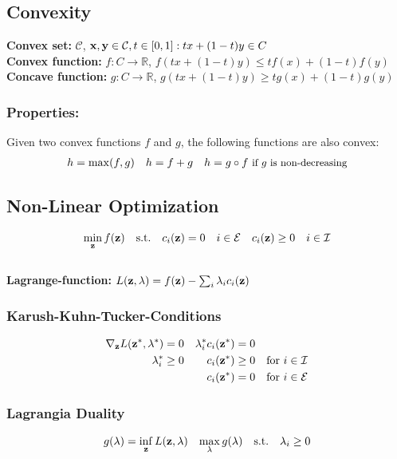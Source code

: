 \begin{mdframed}[style=eqbox]
\subsection{Convexity}
\textbf{Convex set:} $\mathcal C$, $\mathbf{x}, \mathbf{y} \in \mathcal C, t \in [0,1]: t x + (1-t)y \in C$\\
\textbf{Convex function:} $f: C \to \mathbb R$, $f(t x + (1-t)y) \leq tf(x) + (1-t)f(y)$\\
\textbf{Concave function:} $g: C \to \mathbb R$, $g(t x + (1-t)y) \geq tg(x) + (1-t)g(y)$
\subsubsection{Properties:}
Given two convex functions $f$ and $g$, the following functions are also convex:
\vspace*{-8pt}\begin{align*}
  h = \max (f, g) && h = f + g && h = g \circ f \text{ \small{if $g$ is non-decreasing}}
\end{align*}
\end{mdframed}
%
\begin{mdframed}[style=eqbox]
\subsection{Non-Linear Optimization}
\vspace*{-6pt}\begin{align*}
  \min_{\mathbf{z}} f(\mathbf{z}) &&\text{s.t.} \quad c_i(\mathbf{z}) = 0 \quad i \in \mathcal E && c_i(\mathbf{z}) \geq 0 \quad i \in \mathcal I
\end{align*}\vspace*{-14pt}\\
\textbf{Lagrange-function:} $L(\mathbf{z}, \mathbf{\lambda}) = f(\mathbf{z}) - \sum_i \lambda_i c_i(\mathbf{z})$
\subsubsection{Karush-Kuhn-Tucker-Conditions}
\vspace*{-8pt}\begin{align*}
  \nabla_{\mathbf{z}} L(\mathbf{z}^*, \mathbf{\lambda}^*) = 0 && \lambda_i^* c_i(\mathbf{z}^*) = 0\\
  \lambda_i^* \geq 0 && c_i(\mathbf{z}^*) \geq 0 && \text{for } i \in \mathcal I\\
  && c_i(\mathbf{z}^*) = 0 && \text{for } i \in \mathcal E
\end{align*}
\subsubsection{Lagrangia Duality}
\vspace*{-6pt}\begin{align*}
  g(\mathbf{\lambda}) = \inf_{\mathbf{z}} L(\mathbf{z}, \mathbf{\lambda}) && \max_{\mathbf{\lambda}} g(\mathbf{\lambda}) \quad \text{s.t.} \quad \lambda_i \geq 0
\end{align*}
\end{mdframed}